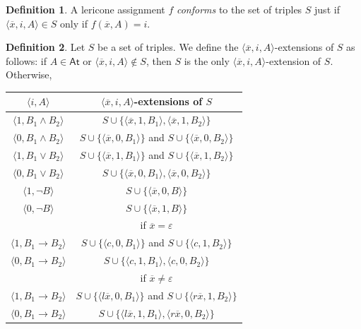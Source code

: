 \documentclass{amsart}
\theoremstyle{definition}
\newtheorem{mdef}{Definition}
\newcommand{\At}{\mathsf{At}}
\begin{document}
\begin{mdef}
    A lericone assignment $f$ \emph{conforms} to the set of triples $S$ just if $\langle\overline{x},i,A\rangle\in S$ only if $f(\overline{x},A)=i$.
\end{mdef}

\begin{mdef}
    Let $S$ be a set of triples. We define the $\langle\overline{x},i,A\rangle$-extensions of $S$ as follows: if $A\in\At$ or $\langle\overline{x},i,A\rangle\not\in S$, then $S$ is the only $\langle\overline{x},i,A\rangle$-extension of $S$. Otherwise,
    \begin{center}\begin{tabular}{|c|c|}\hline
        $\langle i,A\rangle$  &   $\langle\overline{x},i,A\rangle$-extensions of $S$ \\ \hline \hline
        $\langle 1,B_1\land B_2\rangle$  &  $S\cup\{\langle\overline{x},1,B_1\rangle,\langle\overline{x},1,B_2\rangle\}$ \\ 
        $\langle 0,B_1\land B_2\rangle$  &  $S\cup\{\langle\overline{x},0,B_1\rangle\}$ and $S\cup\{\langle\overline{x},0,B_2\rangle\}$ \\ \hline
        $\langle 1,B_1\lor B_2\rangle$  &  $S\cup\{\langle\overline{x},1,B_1\rangle\}$ and $S\cup\{\langle\overline{x},1,B_2\rangle\}$ \\ 
        $\langle 0,B_1\lor B_2\rangle$  &  $S\cup\{\langle\overline{x},0,B_1\rangle,\langle\overline{x},0,B_2\rangle\}$ \\ \hline
        $\langle 1,\neg B\rangle$  &  $S\cup\{\langle\overline{x},0,B\rangle\}$ \\
        $\langle 0,\neg B\rangle$  &  $S\cup\{\langle\overline{x},1,B\rangle\}$ \\ \hline
        & if $\overline{x}=\varepsilon$ \\
        $\langle 1,B_1\to B_2\rangle$  &  $S\cup\{\langle {c},0,B_1\rangle\}$ and $S\cup\{\langle {c},1,B_2\rangle\}$ \\ 
        $\langle 0,B_1\to B_2\rangle$  &  $S\cup\{\langle {c},1,B_1\rangle,\langle {c},0,B_2\rangle\}$ \\ \hline
        & if $\overline{x}\neq\varepsilon$ \\
        $\langle 1,B_1\to B_2\rangle$  &  $S\cup\{\langle l{\overline{x}},0,B_1\rangle\}$ and $S\cup\{\langle r{\overline{x}},1,B_2\rangle\}$ \\ 
        $\langle 0,B_1\to B_2\rangle$  &  $S\cup\{\langle l{\overline{x}},1,B_1\rangle,\langle r{\overline{x}},0,B_2\rangle\}$ \\ \hline
    \end{tabular}\end{center}
\end{mdef}
\end{document}
